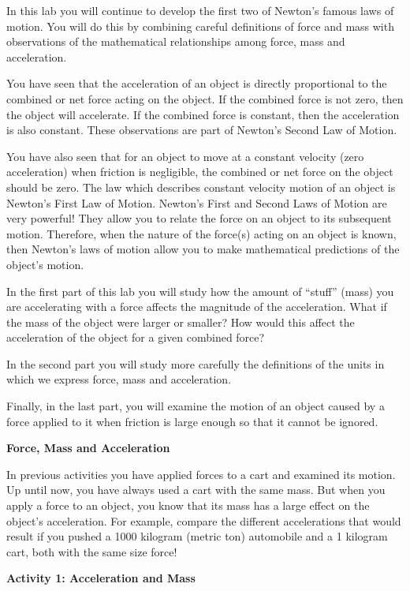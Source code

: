 In this lab you will continue to develop the first two of Newton's famous laws
of motion. You will do this by combining careful definitions of force and mass
with observations of the mathematical relationships among force, mass and acceleration.

You have seen that the acceleration of an object is directly proportional to
the combined or net force acting on the object. If the combined force is not
zero, then the object will accelerate. If the combined force is constant, then
the acceleration is also constant. These observations are part of Newton's Second
Law of Motion.

You have also seen that for an object to move at a constant velocity (zero acceleration)
when friction is negligible, the combined or net force on the object should
be zero. The law which describes constant velocity motion of an object is Newton's
First Law of Motion. Newton's First and Second Laws of Motion are very powerful!
They allow you to relate the force on an object to its subsequent motion. Therefore,
when the nature of the force(s) acting on an object is known, then Newton's
laws of motion allow you to make mathematical predictions of the object's motion. 

In the first part of this lab you will study how the amount of ``stuff''
(mass) you are accelerating with a force affects the magnitude of the acceleration.
What if the mass of the object were larger or smaller? How would this affect
the acceleration of the object for a given combined force? 

In the second part you will study more carefully the definitions of the units
in which we express force, mass and acceleration.

Finally, in the last part, you will examine the motion of an object caused by
a force applied to it when friction is large enough so that it cannot be ignored.

\textbf{Force, Mass and Acceleration }

In previous activities you have applied forces to a cart and examined its motion.
Up until now, you have always used a cart with the same mass. But when you apply
a force to an object, you know that its mass has a large effect on the object's
acceleration. For example, compare the different accelerations that would result
if you pushed a 1000 kilogram (metric ton) automobile and a 1 kilogram cart,
both with the same size force! 

\textbf{Activity 1: Acceleration and Mass }

